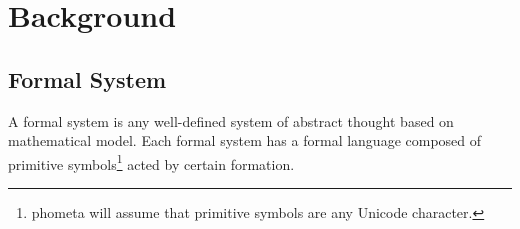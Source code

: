 



\chapter{Background}

\section{Formal System}

A formal system is any well-defined system of abstract thought based on mathematical model\supercite{formal-system-wiki}. Each formal system has a formal language composed of primitive symbols\footnote{phometa will assume that primitive symbols are any Unicode character.} acted by certain formation\supercite{formal-system-britannica}.









